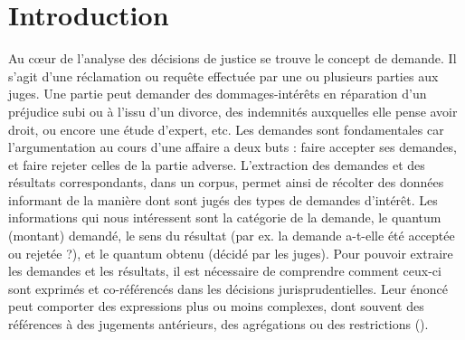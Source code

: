 \section{Introduction}
\label{sec:quanta:introduction}


Au c\oe{}ur de l'analyse des décisions de justice se trouve le concept de demande. Il s'agit d'une réclamation ou requête effectuée par une ou plusieurs parties aux juges. Une partie peut demander des dommages-intérêts en réparation d'un préjudice subi ou à l'issu d'un divorce, des indemnités auxquelles elle pense avoir droit, ou encore une étude d'expert, etc. Les demandes sont fondamentales car l'argumentation au cours d'une affaire a deux buts : faire accepter ses demandes, et faire rejeter celles de la partie adverse. L'extraction des demandes et des résultats correspondants, dans un corpus, permet ainsi de récolter des données informant de la manière dont sont jugés des types de demandes d'intérêt. Les informations qui nous intéressent sont la catégorie de la demande, le quantum (montant) demandé, le sens du résultat (par ex. la demande a-t-elle été acceptée ou rejetée ?), et le quantum obtenu (décidé par les juges). Pour pouvoir extraire les demandes et les résultats, il est nécessaire de comprendre comment ceux-ci sont exprimés et co-référencés dans les décisions jurisprudentielles. Leur énoncé peut comporter des expressions plus ou moins complexes, dont souvent des références à des jugements antérieurs, des agrégations ou des restrictions ().


